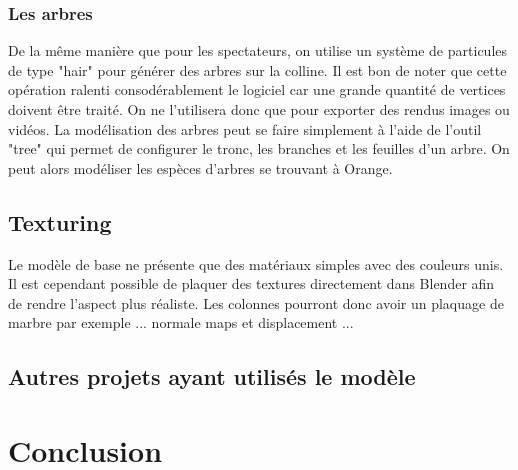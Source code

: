 \subsection{Les arbres}
De la même manière que pour les spectateurs, on utilise un système de \glspl{particule} de type "hair" pour générer des arbres sur la colline. Il est bon de noter que cette opération ralenti consodérablement le logiciel car une grande quantité de vertices doivent être traité. On ne l'utilisera donc que pour exporter des rendus images ou vidéos. La modélisation des arbres peut se faire simplement à l'aide de l'outil "tree" qui permet de configurer le tronc, les branches et les feuilles d'un arbre. On peut alors modéliser les espèces d'arbres se trouvant à Orange.


\section{Texturing} 
Le modèle de base ne présente que des matériaux simples avec des couleurs unis. Il est cependant possible de plaquer des textures directement dans Blender afin de rendre l'aspect plus réaliste. Les colonnes pourront donc avoir un plaquage de marbre par exemple 
... normale maps et displacement ...

\section{Autres projets ayant utilisés le modèle}
		
	\chapter*{Conclusion}
		\newpage
			
 \nocite{*}
 
 


